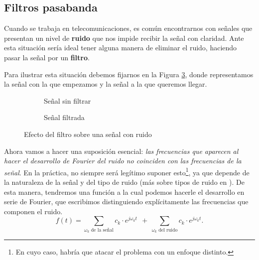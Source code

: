 \subsection{Filtros pasabanda}
Cuando se trabaja en telecomunicaciones, es común encontrarnos con
señales que presentan un nivel de \textbf{ruido} que nos impide
recibir la señal con claridad. Ante esta situación sería ideal tener
alguna manera de eliminar el ruido, haciendo pasar la señal por un
\textbf{filtro}.

Para ilustrar esta situación debemos fijarnos en la Figura
\ref{fig:EfectoFiltro}, donde representamos la señal con la que
empezamos y la señal a la que queremos llegar.


\begin{figure}[h]
\begin{figurebox}
    \vspace{10pt}
    \centering
      \begin{subfigure}{.45\textwidth}
          \centering
          \scalebox{0.30}{ }
          \caption{Señal sin filtrar}
          \label{fig:ab} 
      \end{subfigure}%
      \begin{subfigure}{.45\textwidth}
          \centering
          \scalebox{0.30}{}
          \caption{Señal filtrada}
          \label{fig:bb}
      \end{subfigure}
      \caption{Efecto del filtro sobre una señal con ruido}
      \label{fig:EfectoFiltro}
    
\end{figurebox}
\end{figure}

Ahora vamos a hacer una suposición esencial: \textit{las frecuencias que aparecen al hacer el desarrollo de Fourier del ruido no coinciden con las frecuencias de la señal}. En la práctica, no siempre será legítimo suponer esto\footnote{ En cuyo caso, habría que atacar el problema con un enfoque distinto.}, ya que depende de la naturaleza de la señal y del tipo de ruido (más sobre tipos de ruido en \cite{ColorNoise}). De esta manera, tendremos una función a la cual podemos hacerle el desarrollo en serie de Fourier, que escribimos distinguiendo explícitamente las frecuencias que componen el ruido.
\begin{equation}
  \label{eq:FourierSignalRuido1}
  f(t) = \sum_{\omega_k\text{ de la señal}}\!\!\!\!\!\!\!c_k \cdot e^{j\omega_k t}\ \ +\  \sum_{\omega_k\text{ del ruido}}\!\!\!\!\!c_k \cdot e^{j\omega_k t}.
\end{equation}


